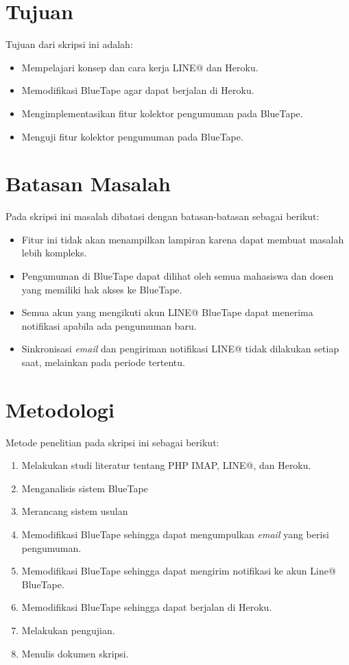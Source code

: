 \section{Tujuan}
\label{sec:tujuan}
Tujuan dari skripsi ini adalah:
\begin{itemize}
	\item Mempelajari konsep dan cara kerja LINE@ dan Heroku.
	\item Memodifikasi BlueTape agar dapat berjalan di Heroku.
	\item Mengimplementasikan fitur kolektor pengumuman pada BlueTape.
	\item Menguji fitur kolektor pengumuman pada BlueTape.
\end{itemize}

\section{Batasan Masalah}
\label{sec:batasan}
Pada skripsi ini masalah dibatasi dengan batasan-batasan sebagai berikut:
\begin{itemize}
	\item Fitur ini tidak akan menampilkan lampiran karena dapat membuat masalah lebih kompleks.
	\item Pengumuman di BlueTape dapat dilihat oleh semua mahasiswa dan dosen yang memiliki hak akses ke BlueTape.
	\item Semua akun yang mengikuti akun LINE@ BlueTape dapat menerima notifikasi apabila ada pengumuman baru.
	\item Sinkronisasi \textit{email} dan pengiriman notifikasi LINE@ tidak dilakukan setiap saat, melainkan pada periode tertentu.
\end{itemize}

\section{Metodologi}
\label{sec:metodepenelitian}
Metode penelitian pada skripsi ini sebagai berikut:
	\begin{enumerate}
		\item Melakukan studi literatur tentang PHP IMAP, LINE@, dan Heroku.
		\item Menganalisis sistem BlueTape
		\item Merancang sistem usulan
		\item Memodifikasi BlueTape sehingga dapat mengumpulkan \textit{email} yang berisi pengumuman.
		\item Memodifikasi BlueTape sehingga dapat mengirim notifikasi ke akun Line@ BlueTape.
		\item Memodifikasi BlueTape sehingga dapat berjalan di Heroku.
		\item Melakukan pengujian.
		\item Menulis dokumen skripsi.
	\end{enumerate}

